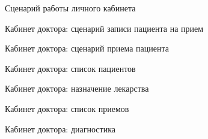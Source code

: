 
\begin{figure}[h]
\caption{Сценарий работы личного кабинета}
\label{app:cabinet_sequence}
\end{figure}

\newpage
\begin{figure}[h]
\caption{Кабинет доктора: сценарий записи пациента на прием}
\label{app:patient_assigning_appointment_seq_diagr}
\end{figure}

\newpage
\begin{figure}[h]
\caption{Кабинет доктора: сценарий приема пациента}
\label{app:doctor_cabient_appointment}


\end{figure}

\newpage
\begin{figure}[h]
\caption{Кабинет доктора: список пациентов}
\label{app:doctor_cabinet_patients}
\end{figure}

\newpage \begin{figure}[h]
\caption{Кабинет доктора: назначение лекарства}
\label{app:doctor_cabinet_medicament}
\end{figure}

\newpage \begin{figure}[h]
\caption{Кабинет доктора: список приемов}
\label{app:doctor_cabinet_appointments}
\end{figure}

\newpage \begin{figure}[h]
\caption{Кабинет доктора: диагностика}
\label{app:doctor_cabinet_diagnostic}
\end{figure}

